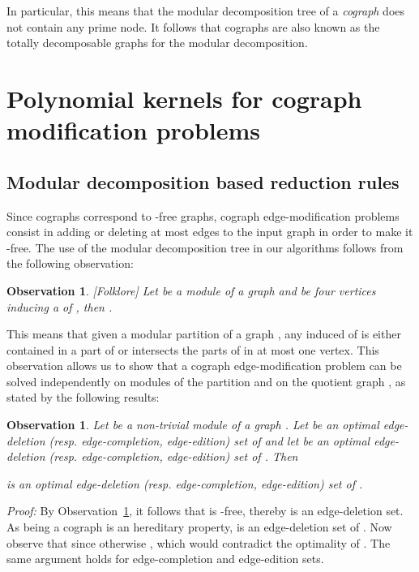 \documentclass[11pt]{article}
\newenvironment{proof}{\noindent\textit{Proof: }}{{\hfill }}
\newtheorem{observation}[lemma]{Observation}
\begin{document}
In particular, this means that the modular decomposition tree of a \emph{cograph} does not contain any prime node. It follows that cographs are also known as the totally decomposable graphs for the modular decomposition.

\section{Polynomial kernels for cograph modification problems}
\label{sec:kernels}

\subsection{Modular decomposition based reduction rules}


Since cographs correspond to -free graphs, cograph edge-modification problems consist in adding or deleting at most  edges to the input graph in order to make it -free. The use of the modular decomposition tree in our algorithms follows from the following observation: 

\begin{observation}\label{obs:p4} [Folklore]
Let  be a module of a graph  and  be four vertices inducing a  of , then .
\end{observation}

This means that given a modular partition  of a graph , any induced  of  is either contained in a part of  or intersects the parts of  in at most one vertex. This observation allows us to show that a cograph edge-modification problem can be solved independently on modules of the partition  and on the quotient graph , as stated by the following results:

\begin{observation} \label{obs:module}
Let  be a non-trivial module of a graph . Let  be an optimal edge-deletion (resp. edge-completion, edge-edition) set of  and  let  be an optimal edge-deletion (resp. edge-completion, edge-edition) set of . Then 

is an optimal edge-deletion (resp. edge-completion, edge-edition) set of .
\end{observation}

\begin{proof}
By Observation~\ref{obs:p4}, it follows that  is -free, thereby  is an edge-deletion set. 
As being a cograph is an hereditary property,  is an edge-deletion set of . Now observe that   since otherwise , which would contradict the optimality of . The same argument holds for edge-completion and edge-edition sets.
 \end{proof}
\end{document}
